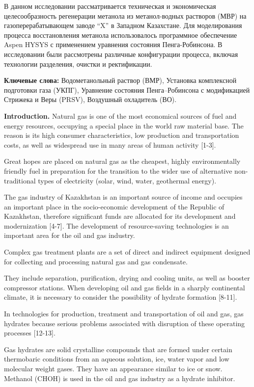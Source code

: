 В данном исследовании рассматривается техническая и экономическая
целесообразность регенерации метанола из метанол-водных растворов (МВР)
на газоперерабатывающем заводе ``X'' в Западном Казахстане. Для
моделирования процесса восстановления метанола использовалось
программное обеспечение Aspen HYSYS с применением уравнения состояния
Пенга-Робинсона. В исследовании были рассмотрены различные конфигурации
процесса, включая технологии разделения, очистки и ректификации.

{\bfseries Ключевые слова:} Водометанольный раствор (ВМР), Установка
комплексной подготовки газа (УКПГ), Уравнение состояния Пенга--Робинсона
с модификацией Стрижека и Веры (PRSV), Воздушный охладитель (ВО).

{\bfseries Introduction.} Natural gas is one of the most economical sources
of fuel and energy resources, occupying a special place in the world raw
material base. The reason is its high consumer characteristics, low
production and transportation costs, as well as widespread use in many
areas of human activity {[}1-3{]}.

Great hopes are placed on natural gas as the cheapest, highly
environmentally friendly fuel in preparation for the transition to the
wider use of alternative non-traditional types of electricity (solar,
wind, water, geothermal energy).

The gas industry of Kazakhstan is an important source of income and
occupies an important place in the socio-economic development of the
Republic of Kazakhstan, therefore significant funds are allocated for
its development and modernization {[}4-7{]}. The development of
resource-saving technologies is an important area for the oil and gas
industry.

Complex gas treatment plants are a set of direct and indirect equipment
designed for collecting and processing natural gas and gas condensate.

They include separation, purification, drying and cooling units, as well
as booster compressor stations. When developing oil and gas fields in a
sharply continental climate, it is necessary to consider the possibility
of hydrate formation {[}8-11{]}.

In technologies for production, treatment and transportation of oil and
gas, gas hydrates because serious problems associated with disruption of
these operating processes {[}12-13{]}.

Gas hydrates are solid crystalline compounds that are formed under
certain thermobaric conditions from an aqueous solution, ice, water
vapor and low molecular weight gases. They have an appearance similar to
ice or snow. Methanol (CHOH) is used in the oil and gas
industry as a hydrate inhibitor.

